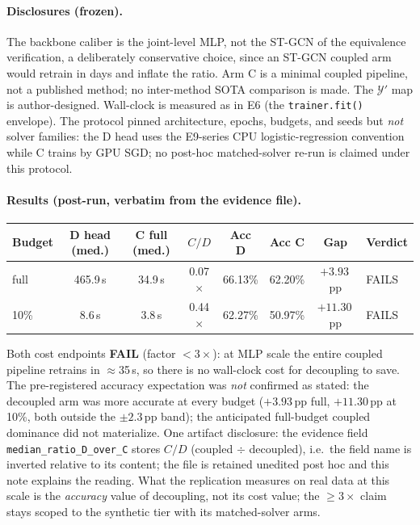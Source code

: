 \documentclass[11pt,a4paper]{article}
\begin{document}
\paragraph{Disclosures (frozen).}
The backbone caliber is the joint-level MLP, not the ST-GCN of the equivalence verification, a deliberately conservative choice, since an ST-GCN coupled arm would retrain in days and inflate the ratio. Arm C is a minimal coupled pipeline, not a published method; no inter-method SOTA comparison is made. The $\mathcal{Y}'$ map is author-designed. Wall-clock is measured as in E6 (the \texttt{trainer.fit()} envelope). The protocol pinned architecture, epochs, budgets, and seeds but \emph{not} solver families: the D head uses the E9-series CPU logistic-regression convention while C trains by GPU SGD; no post-hoc matched-solver re-run is claimed under this protocol.

\paragraph{Results (post-run, verbatim from the evidence file).}
\begin{center}
\begin{tabular}{lccccccl}
\toprule
Budget & D head (med.) & C full (med.) & $C/D$ & Acc D & Acc C & Gap & Verdict \\
\midrule
full & 465.9\,s & 34.9\,s & 0.07$\times$ & 66.13\% & 62.20\% & $+3.93$\,pp & FAILS \\
10\% & 8.6\,s & 3.8\,s & 0.44$\times$ & 62.27\% & 50.97\% & $+11.30$\,pp & FAILS \\
\bottomrule
\end{tabular}
\end{center}
Both cost endpoints \textbf{FAIL} (factor $< 3\times$): at MLP scale the entire coupled pipeline retrains in $\approx$35\,s, so there is no wall-clock cost for decoupling to save. The pre-registered accuracy expectation was \emph{not} confirmed as stated: the decoupled arm was more accurate at every budget ($+3.93$\,pp full, $+11.30$\,pp at 10\%, both outside the $\pm 2.3$\,pp band); the anticipated full-budget coupled dominance did not materialize. One artifact disclosure: the evidence field \texttt{median\_ratio\_D\_over\_C} stores $C/D$ (coupled $\div$ decoupled), i.e.\ the field name is inverted relative to its content; the file is retained unedited post hoc and this note explains the reading. What the replication measures on real data at this scale is the \emph{accuracy} value of decoupling, not its cost value; the $\geq 3\times$ claim stays scoped to the synthetic tier with its matched-solver arms.
\end{document}
